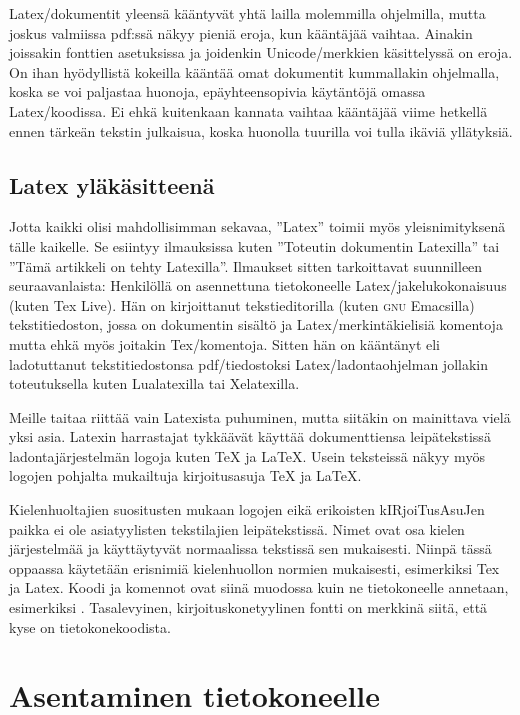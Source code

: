 Latex\-/dokumentit yleensä kääntyvät yhtä lailla molemmilla ohjelmilla,
mutta joskus valmiissa pdf:ssä näkyy pieniä eroja, kun kääntäjää
vaihtaa. Ainakin joissakin fonttien asetuksissa ja joidenkin
Unicode\-/merkkien käsittelyssä on eroja. On ihan hyödyllistä kokeilla
kääntää omat dokumentit kummallakin ohjelmalla, koska se voi paljastaa
huonoja, epäyhteensopivia käytäntöjä omassa Latex\-/koodissa. Ei ehkä
kuitenkaan kannata vaihtaa kääntäjää viime hetkellä ennen tärkeän
tekstin julkaisua, koska huonolla tuurilla voi tulla ikäviä yllätyksiä.

\subsection{Latex yläkäsitteenä}

Jotta kaikki olisi mahdollisimman sekavaa, ''Latex'' toimii myös
yleisnimityksenä tälle kaikelle. Se esiintyy ilmauksissa kuten
''Toteutin dokumentin Latexilla'' tai ''Tämä artikkeli on tehty
Latexilla''. Ilmaukset sitten tarkoittavat suunnilleen seuraavanlaista:
Henkilöllä on asennettuna tietokoneelle Latex\-/jakelukokonaisuus (kuten
Tex Live). Hän on kirjoittanut tekstieditorilla (kuten \textsc{gnu}
Emacsilla) tekstitiedoston, jossa on dokumentin sisältö ja
Latex\-/merkintäkielisiä komentoja mutta ehkä myös joitakin
Tex\-/komentoja. Sitten hän on kääntänyt eli ladotuttanut
tekstitiedostonsa pdf\-/tiedostoksi Latex\-/ladontaohjelman jollakin
toteutuksella kuten Lualatexilla tai Xelatexilla.

Meille taitaa riittää vain Latexista puhuminen, mutta siitäkin on
mainittava vielä yksi asia. Latexin harrastajat tykkäävät käyttää
dokumenttiensa leipätekstissä ladontajärjestelmän logoja kuten \TeX{} ja
\LaTeX{}. Usein teksteissä näkyy myös logojen pohjalta mukailtuja
kirjoitusasuja TeX ja LaTeX.

Kielenhuoltajien suositusten mukaan logojen eikä erikoisten
kIRjoiTusAsuJen paikka ei ole asiatyylisten tekstilajien leipätekstissä.
Nimet ovat osa kielen järjestelmää ja käyttäytyvät normaalissa tekstissä
sen mukaisesti. Niinpä tässä oppaassa käytetään erisnimiä kielenhuollon
normien mukaisesti, esimerkiksi Tex ja Latex. Koodi ja komennot ovat
siinä muodossa kuin ne tietokoneelle annetaan, esimerkiksi
. Tasalevyinen, kirjoituskonetyylinen fontti on merkkinä
siitä, että kyse on tietokonekoodista.

\section{Asentaminen tietokoneelle}
\label{luku:asentaminen}

